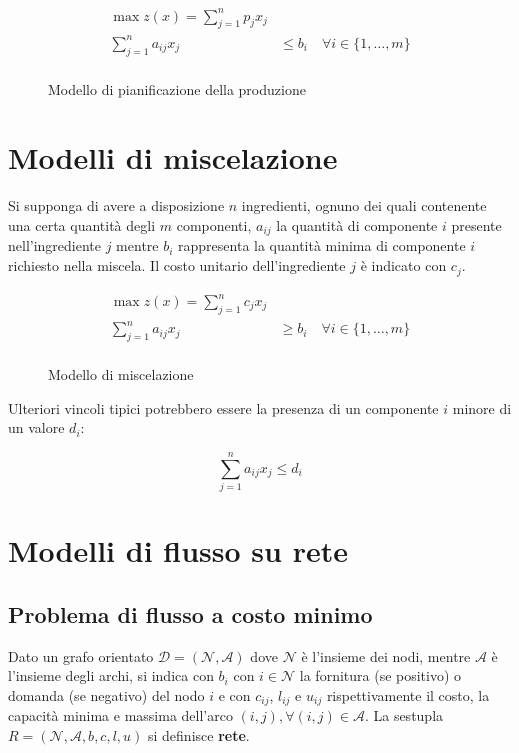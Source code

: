 \documentclass[\main/main.tex]{subfiles}
\begin{document}
\begin{figure}
	\begin{align*}
		\max z(x) = \sum_{j=1}^n p_jx_j                                      \\
		\sum_{j=1}^n a_{ij}x_j & \leq b_i \quad \forall i \in \{1,\ldots,m\} \\
	\end{align*}
	\caption{Modello di pianificazione della produzione}
\end{figure}

\section{Modelli di miscelazione}
Si supponga di avere a disposizione $n$ ingredienti, ognuno dei quali contenente una certa quantità degli $m$ componenti, $a_{ij}$ la quantità di componente $i$ presente nell'ingrediente $j$ mentre $b_i$ rappresenta la quantità minima di componente $i$ richiesto nella miscela. Il costo unitario dell'ingrediente $j$ è indicato con $c_j$.

\begin{figure}
	\begin{align*}
		\max z(x) = \sum_{j=1}^n c_jx_j                                      \\
		\sum_{j=1}^n a_{ij}x_j & \geq b_i \quad \forall i \in \{1,\ldots,m\} \\
	\end{align*}
	\caption{Modello di miscelazione}
\end{figure}

Ulteriori vincoli tipici potrebbero essere la presenza di un componente $i$ minore di un valore $d_i$:

\[
	\sum_{j=1}^n a_{ij} x_j \leq d_i
\]

\section{Modelli di flusso su rete}

\subsection{Problema di flusso a costo minimo}  \label{min_cost_flux_sect}
Dato un grafo orientato $\mathcal{D} = (\mathcal{N}, \mathcal{A})$ dove $\mathcal{N}$ è l'insieme dei nodi, mentre $\mathcal{A}$ è l'insieme degli archi, si indica con $b_i$ con $i \in \mathcal{N}$ la fornitura (se positivo) o domanda (se negativo) del nodo $i$ e con $c_{ij}$, $l_{ij}$ e $u_{ij}$ rispettivamente il costo, la capacità minima e massima dell'arco $(i,j), \forall (i,j) \in \mathcal{A}$. La sestupla $R = (\mathcal{N}, \mathcal{A}, b, c, l, u)$ si definisce \textbf{rete}.
\end{document}
